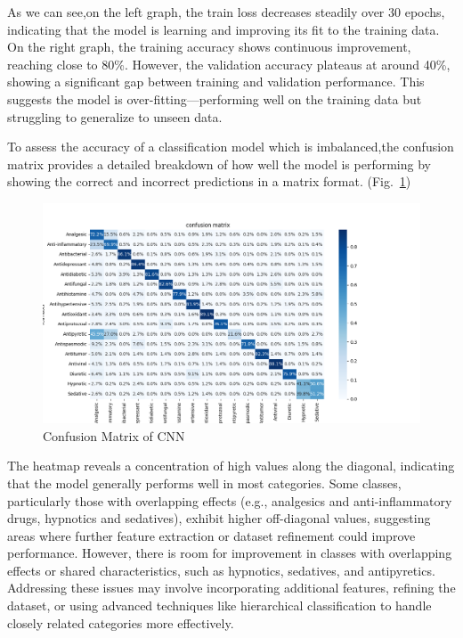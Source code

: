 \documentclass{mcmthesis}
\begin{document}
As we can see,on the left graph, the train loss decreases steadily over 30 epochs, indicating that the model is learning and improving its fit to the training data. On the right graph, the training accuracy shows continuous improvement, reaching close to 80\%. However, the validation accuracy plateaus at around 40\%, showing a significant gap between training and validation performance. This suggests the model is over-fitting—performing well on the training data but struggling to generalize to unseen data. 

To assess the accuracy of a classification model which is imbalanced,the  confusion matrix provides a detailed breakdown of how well the model is performing by showing the correct and incorrect predictions in a matrix format. (Fig.~\ref{fig:Confusion_Matrix_of_CNN})

\begin{figure}[htbp]
\centering
\includegraphics[width =\textwidth]{pics/Confusion_Matrix_of_CNN.png}
\caption{Confusion Matrix of CNN}
\label{fig:Confusion_Matrix_of_CNN}
\end{figure}

The heatmap reveals a concentration of high values along the diagonal, indicating that the model generally performs well in most categories.
Some classes, particularly those with overlapping effects (e.g., analgesics and anti-inflammatory drugs, hypnotics and sedatives), exhibit higher off-diagonal values, suggesting areas where further feature extraction or dataset refinement could improve performance. However, there is room for improvement in classes with overlapping effects or shared characteristics, such as hypnotics, sedatives, and antipyretics. Addressing these issues may involve incorporating additional features, refining the dataset, or using advanced techniques like hierarchical classification to handle closely related categories more effectively.
\end{document}
